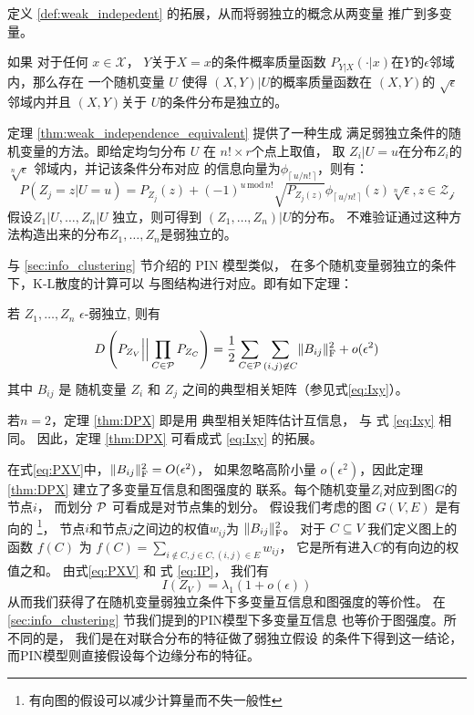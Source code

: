 定义 \ref{def:weak_indepedent} 的拓展，从而将弱独立的概念从两变量
推广到多变量。
\begin{theorem}\label{thm:weak_independence_equivalent}
  如果 对于任何 $x \in \mathcal{X}$，
$Y$关于$X=x$的条件概率质量函数
$P_{Y|X}(\cdot |x)$在$Y$的$\epsilon$邻域内，那么存在
一个随机变量 $U$
  使得
  $(X, Y)|U$的概率质量函数在 $(X, Y)$的
  $\sqrt{\epsilon}$邻域内并且
  $(X, Y)$关于
  $U$的条件分布是独立的。
\end{theorem}
  定理 \ref{thm:weak_independence_equivalent} 提供了一种生成
  满足弱独立条件的随机变量的方法。即给定均匀分布
  $U$ 在 $n! \times r$个点上取值，
  取 $Z_i|U=u$在分布$Z_i$的
  $\sqrt[n]{\epsilon}$ 邻域内，并记该条件分布对应
  的信息向量为$\phi_{\lceil\, u/n!\, \rceil}$，则有：
  \begin{equation}
    P(Z_j=z|U=u) = P_{Z_j}(z) + 
    (-1)^{u \,\mathrm{mod}\, n!}\sqrt{P_{Z_j(z)}}
    \phi_{\lceil\, u/n!\, \rceil}(z) \sqrt[n]{\epsilon}, z \in \mathcal{Z_j}
  \end{equation}
  假设$Z_1|U, \dots, Z_n|U$ 独立，则可得到
  $(Z_1, \dots, Z_n)|U$的分布。
  不难验证通过这种方法构造出来的分布$Z_1, \dots, Z_n$是弱独立的。

与 \ref{sec:info_clustering} 节介绍的 PIN 模型类似，
在多个随机变量弱独立的条件下，K-L散度的计算可以
与图结构进行对应。即有如下定理：
\begin{theorem}\label{thm:DPX}
若 $Z_1, \dots, Z_n$ $\epsilon$-弱独立, 则有
\begin{equation}\label{eq:PXV}
D\left(P_{Z_V} \Big|\Big| \prod_{C\in \P} P_{Z_C} \right)
= {1 \over 2}
\sum_{C\in \P}\sum_{(i,j) \not\in C} \norm{B_{ij}}_{\mathrm{F}}^2 + o(\epsilon^2)
\end{equation}
其中 $B_{ij}$ 是 随机变量  $Z_i$ 和 $Z_j$
之间的典型相关矩阵（参见式\eqref{eq:Ixy}）。
\end{theorem}
若$ n = 2$，定理 \ref{thm:DPX} 即是用 典型相关矩阵估计互信息，
与 式 \eqref{eq:Ixy} 相同。
因此，定理 \ref{thm:DPX} 可看成式 \eqref{eq:Ixy} 
的拓展。

在式\eqref{eq:PXV}中，$\norm{B_{ij}}_{\mathrm{F}}^2 =O(\epsilon^2)$，
如果忽略高阶小量 $o(\epsilon^2)$，因此定理 \ref{thm:DPX} 建立了多变量互信息和图强度的
联系。每个随机变量$Z_i$对应到图$G$的节点$i$，
而划分 $\P$
可看成是对节点集的划分。
假设我们考虑的图 $G(V, E)$ 是有向的
\footnote{有向图的假设可以减少计算量而不失一般性}，
节点$i$和节点$j$之间边的权值$w_{ij}$为
$\norm{B_{ij}}_{\mathrm{F}}^2$。
对于 $C\subseteq V$
我们定义图上的函数 $f(C)$ 
 为 $f(C) = \sum_{i\not\in C, j\in C, (i,j) \in E} w_{ij}$，
它是所有进入$C$的有向边的权值之和。
由式\eqref{eq:PXV}
和 式 \eqref{eq:IP}，
我们有
\begin{equation}\label{eq:PXV_Data_Simplified}
I(Z_V) = \lambda_1 (1 + o(\epsilon))
\end{equation}
从而我们获得了在随机变量弱独立条件下多变量互信息和图强度的等价性。
在 \ref{sec:info_clustering} 节我们提到的PIN模型下多变量互信息
也等价于图强度。所不同的是，
我们是在对联合分布的特征做了弱独立假设
的条件下得到这一结论，而PIN模型则直接假设每个边缘分布的特征。

